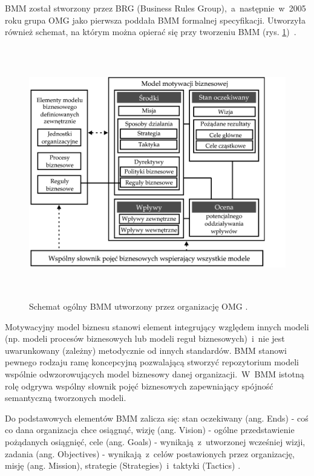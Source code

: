 BMM został stworzony przez BRG (Business Rules Group),~a~następnie~w~2005 roku grupa OMG jako pierwsza poddała BMM formalnej specyfikacji. Utworzyła również schemat, na którym można opierać się przy tworzeniu BMM (rys. \ref{BMM_schem})~\cite{AnaWesHal}.

\begin{figure}[h!tbp]
\begin{centering}
\includegraphics[width=12cm, height=11cm]{img/BMM_PL.png}
\caption[Schemat ogólny BMM utworzony przez organizację OMG.]{Schemat ogólny BMM utworzony przez organizację OMG \cite{BMMOmg}.}\label{BMM_schem}
\end{centering}
\end{figure}

Motywacyjny model biznesu stanowi element integrujący względem innych modeli (np. modeli procesów biznesowych lub modeli reguł biznesowych)~i~nie jest uwarunkowany (zależny) metodycznie od innych standardów. BMM stanowi pewnego rodzaju ramę koncepcyjną pozwalającą stworzyć repozytorium modeli wspólnie odwzorowujących model biznesowy danej organizacji.~W~BMM istotną rolę odgrywa wspólny słownik pojęć biznesowych zapewniający spójność semantyczną tworzonych modeli.

Do podstawowych elementów BMM zalicza się: stan oczekiwany (ang. Ends) - coś co dana organizacja chce osiągnąć, wizję (ang. Vision) - ogólne przedstawienie pożądanych osiągnięć, cele (ang. Goals) - wynikają~z~utworzonej wcześniej wizji, zadania (ang. Objectives) - wynikają~z~celów postawionych przez organizację, misję (ang. Mission), strategie (Strategies)~i~taktyki (Tactics) \cite{AnaWesHal}. 

